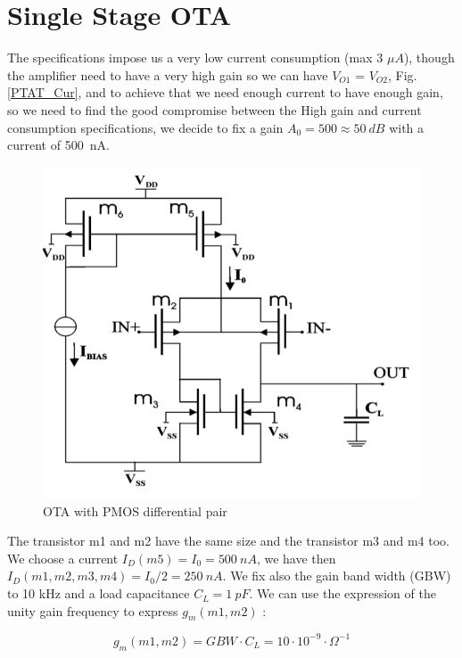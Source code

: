 \documentclass[11pt,a4paper]{report}
\begin{document}
\newpage
\section{Single Stage OTA}

The specifications impose us a very low current consumption (max 3 $\mu A$), though the amplifier need to have a very high gain so we can have $V_{O1}$ = $V_{O2}$, Fig. \ref{PTAT_Cur}, and to achieve that we need enough current to have enough gain, so we need to find the good compromise between the High gain and current consumption specifications, we decide to fix a gain $A_0 = 500 \approx 50~dB$ with a current of 500~nA.

\begin{figure}[h]
  \begin{center}
    \includegraphics[scale=0.3]{photo/OTA_Pmos}
  \end{center}
  \caption{OTA with PMOS differential pair}
  \label{OTA}
\end{figure}

The transistor m1 and m2 have the same size and the transistor m3 and m4 too.
We choose a current $I_D(m5)= I_0 = 500~nA$, we have then $I_D(m1,m2,m3,m4)= I_0/2 =250~nA$. We fix also the gain band width (GBW) to 10 kHz and a load capacitance $C_L = 1~pF$. We can use the expression of the unity gain frequency to express $g_m(m1,m2)$ :

\begin{equation}
  g_m(m1,m2) = GBW\cdot C_L = 10\cdot10^{-9} \cdot \Omega^{-1}
  \end{equation}   
\end{document}
